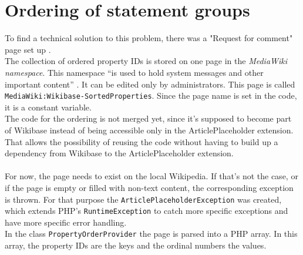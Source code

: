\section{Ordering of statement groups}\label{ordering-stat}

To find a technical solution to this problem, there was a "Request for comment" page set up \citep{wiki:24}. \\

The collection of ordered property IDs is stored on one page in the \textit{MediaWiki namespace}. This namespace ``is used to hold system messages and other important content'' \citep{wiki:17}. It can be edited only by administrators. This page is called \texttt{\justify MediaWiki:Wikibase-SortedProperties}. Since the page name is set in the code, it is a constant variable. \\
The code for the ordering is not merged yet, since it's supposed to become part of Wikibase instead of being accessible only in the ArticlePlaceholder extension. That allows the possibility of reusing the code without having to build up a dependency from Wikibase to the ArticlePlaceholder extension. \\
\\
For now, the page needs to exist on the local Wikipedia. If that's not the case, or if the page is empty or filled with non-text content, the corresponding exception is thrown. For that purpose the \texttt{\justify ArticlePlaceholderException} was created, which extends PHP's \texttt{\justify RuntimeException} to catch more specific exceptions and have more specific error handling. \\
In the class \texttt{\justify PropertyOrderProvider} the page is parsed into a PHP array. In this array, the property IDs are the keys and the ordinal numbers the values. \\

